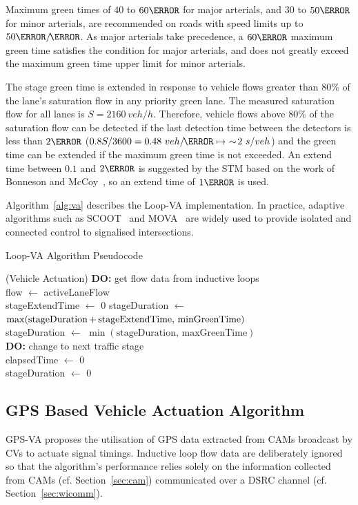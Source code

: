 \documentclass[numbered]{trbunofficial}
\newcommand{\sidiv}{/\hspace{-1.5pt}} %
\begin{document}
Maximum green times of $40$ to $60\s$ for major arterials, and $30$ to $50\s$ for minor arterials, are recommended on roads with speed limits up to $50\km\sidiv\hour$. As major arterials take precedence, a $60\s$ maximum green time satisfies the condition for major arterials, and does not greatly exceed the maximum green time upper limit for minor arterials.

The stage green time is extended in response to vehicle flows greater than $80\%$ of the lane's saturation flow in any priority green lane. The measured saturation flow for all lanes is $S=2160\ veh/h$. Therefore, vehicle flows above $80\%$ of the saturation flow can be detected if the last detection time between the detectors is less than $2\s$ ($0.8S/3600 = 0.48\ veh\sidiv\s \mapsto\ \sim\!2\ s/veh$) and the green time can be extended if the maximum green time is not exceeded. An extend time between $0.1$ and $2\s$ is suggested by the STM based on the work of Bonneson and McCoy~\cite{bonneson2005}, so an extend time of $1\s$ is used.

Algorithm~\ref{alg:va} describes the Loop-VA implementation. In practice, adaptive algorithms such as SCOOT~\cite{hunt1981} and MOVA~\cite{vincent88} are widely used to provide isolated and connected control to signalised intersections.

\begin{algorithm}[h]
	\caption{Loop-VA Algorithm Pseudocode}
	\label{alg:va}
	\SetAlgoVlined
	\SetVlineSkip{3pt}
	\Begin(Vehicle Actuation){
		\textbf{DO:} get flow data from inductive loops\\
		flow $\gets$ activeLaneFlow \\
		{
			stageExtendTime $\gets$ 0
		}
		stageDuration $\gets$ $\max(\text{stageDuration\,+\,\text{stageExtendTime}},\,\text{minGreenTime})$ \\
		stageDuration $\gets$ $\min(\text{stageDuration},\,\text{maxGreenTime})$\\
		{ 
			\textbf{DO:} change to next traffic stage\\
			elapsedTime $\gets$ 0\\
			stageDuration $\gets$ 0
		}
	}
\end{algorithm}
\setlength{\textfloatsep}{2pt}

\subsection{GPS Based Vehicle Actuation Algorithm}\label{sec:gpsva}
GPS-VA proposes the utilisation of GPS data extracted from CAMs broadcast by CVs to actuate signal timings. Inductive loop flow data are deliberately ignored so that the algorithm's performance relies solely on the information collected from CAMs (cf. Section~\ref{sec:cam}) communicated over a DSRC channel (cf. Section~\ref{sec:wicomm}). 
\end{document}
